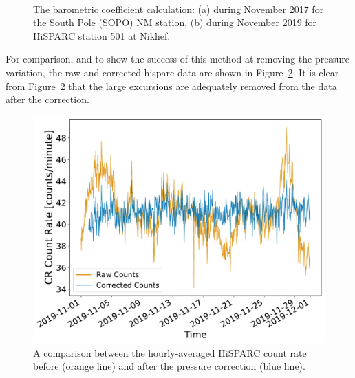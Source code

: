 \begin{figure}[ht]
	\centering
	 \\
	
	\caption{The barometric coefficient calculation: (a) during November 2017 for the South Pole (SOPO) NM station, (b) during November 2019 for HiSPARC station 501 at Nikhef.}
	\label{fig:barometric_fit}
\end{figure}

For comparison, and to show the success of this method at removing the pressure variation, the raw and corrected \gls{hisparc} data are shown in Figure~\ref{fig:HS_P_corr}. It is clear from Figure~\ref{fig:HS_P_corr} that the large excursions are adequately removed from the data after the correction.

\begin{figure}[ht]
	\centering
	\includegraphics[width=0.65\columnwidth]{501_raw_vs_corrected.pdf}
	\caption{A comparison between the hourly-averaged HiSPARC count rate before (orange line) and after the pressure correction (blue line).}
	\label{fig:HS_P_corr}
\end{figure}



